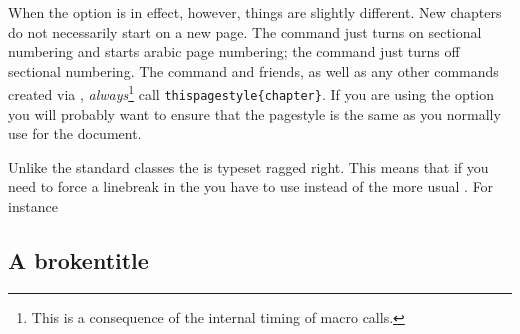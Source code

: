     When the  option is in effect, however, things are slightly
different. New chapters do not necessarily start on a new page.
The \cmd{\mainmatter} command
just turns on sectional numbering and starts arabic page numbering; the
\cmd{\backmatter} command just turns off sectional numbering.
    The \cmd{\tableofcontents} command and friends, as well as any
other commands created via \cmd{\newlistof},
\emph{always}\footnote{This is a consequence of the internal
timing of macro calls.}
call \verb?thispagestyle{chapter}?. If you are using the
 option you
will probably want to ensure that the  pagestyle is the
same as you normally use for the document.

    Unlike the standard classes the  is typeset ragged right.
This means that if you need to force a linebreak in the  you
have to use \cmd{\newline} instead of the more usual \cmd{\\}. For instance
\begin{lcode}
\section{A broken\newline title}
\end{lcode}

